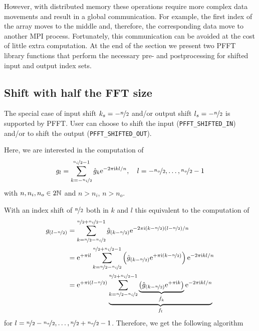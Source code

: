 However, with distributed memory these  operations require more complex data movements and result in a global communication.
For example, the first index of the array moves to the middle and, therefore, the corresponding data move to another MPI process.
Fortunately, this communication can be avoided at the cost of little extra computation.
At the end of the section we present two PFFT library functions that perform the necessary pre- and postprocessing
for shifted input and output index sets.

\subsection{Shift with half the FFT size}

The special case of input shift $k_s=-\nicefrac n2$ and/or output shift $l_s=-\nicefrac n2$ is supported by PFFT.
User can choose to shift the input (\verb+PFFT_SHIFTED_IN+) and/or to shift the output (\verb+PFFT_SHIFTED_OUT+).

Here, we are interested in the computation of
\begin{equation*}
  g_l = \sum_{k=-\nicefrac{n_i}{2}}^{\nicefrac{n_i}{2}-1} \hat g_k \mathrm{e}^{-2\pi{\ensuremath{\text{\scriptsize{i}}}} kl/n}, \quad l=-\nicefrac{n_o}{2},\hdots,\nicefrac{n_o}{2}-1  
\end{equation*}
with $n, n_i, n_o \in 2\mathbb{N}$ and $n>n_i$, $n>n_o$.

With an index shift of $\nicefrac n2$ both in $k$ and $l$ this equivalent to the computation of
\begin{align*}
  g_{(l-\nicefrac{n}{2})}
  &= \sum_{k=\nicefrac{n}{2}-\nicefrac{n_i}{2}}^{\nicefrac{n}{2}+\nicefrac{n_i}{2}-1}
     \hat g_{(k-\nicefrac{n}{2})} \mathrm{e}^{-2\pi{\ensuremath{\text{\scriptsize{i}}}} (k-\nicefrac n2)(l-\nicefrac n2)/n} \\
  &= {\mathrm{e}}^{+\pi\text{\scriptsize{i}} l} 
       \sum_{k=\nicefrac{n}{2}-\nicefrac{n_i}{2}}^{\nicefrac{n}{2}+\nicefrac{n_i}{2}-1}
       \left(\hat g_{(k-\nicefrac{n}{2})}{\mathrm{e}}^{+\pi\text{\scriptsize{i}} (k-\nicefrac n2)}\right) \mathrm{e}^{-2\pi{\ensuremath{\text{\scriptsize{i}}}} kl/n} \\
  &= {\mathrm{e}}^{+\pi\text{\scriptsize{i}}(l-\nicefrac n2)} 
     \underbrace{
       \sum_{k=\nicefrac{n}{2}-\nicefrac{n_i}{2}}^{\nicefrac{n}{2}+\nicefrac{n_i}{2}-1}
       \underbrace{\left(\hat g_{(k-\nicefrac{n}{2})}{\mathrm{e}}^{+\pi\text{\scriptsize{i}} k}\right)}_{\hat f_k} \mathrm{e}^{-2\pi{\ensuremath{\text{\scriptsize{i}}}} kl/n}
     }_{f_l}
\end{align*}
for $ l=\nicefrac n2-\nicefrac{n_o}{2},\hdots,\nicefrac n2 +\nicefrac{n_o}{2}-1$.
Therefore, we get the following algorithm

